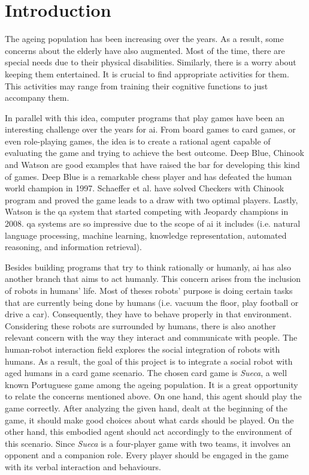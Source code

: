 \section{Introduction} \label{introduction}

The ageing population has been increasing over the years.
As a result, some concerns about the elderly have also augmented.
Most of the time, there are special needs due to their physical disabilities.
Similarly, there is a worry about keeping them entertained.
It is crucial to find appropriate activities for them.
This activities may range from training their cognitive functions to just accompany them.

In parallel with this idea, computer programs that play games have been an interesting challenge over the years for \gls{ai}.
From board games to card games, or even role-playing games, the idea is to create a rational agent capable of evaluating the game and trying to achieve the best outcome.
Deep Blue, Chinook and Watson are good examples that have raised the bar for developing this kind of games.
Deep Blue is a remarkable chess player and has defeated the human world champion in 1997.
Schaeffer et al. have solved Checkers with Chinook program and proved the game leads to a draw with two optimal players.
Lastly, Watson is the \gls{qa} system that started competing with Jeopardy champions in 2008.
\gls{qa} systems are so impressive due to the scope of \gls{ai} it includes (i.e. natural language processing, machine learning, knowledge representation, automated reasoning, and information retrieval).

Besides building programs that try to think rationally or humanly, \gls{ai} has also another branch that aims to act humanly.
This concern arises from the inclusion of robots in humans' life.
Most of theses robots' purpose is doing certain tasks that are currently being done by humans (i.e. vacuum the floor, play football or drive a car).
Consequently, they have to behave properly in that environment.
Considering these robots are surrounded by humans, there is also another relevant concern with the way they interact and communicate with people.
The human-robot interaction field explores the social integration of robots with humans.
As a result, the goal of this project is to integrate a social robot with aged humans in a card game scenario.
The chosen card game is \emph{Sueca}, a well known Portuguese game among the ageing population.
It is a great opportunity to relate the concerns mentioned above.
On one hand, this agent should play the game correctly.
After analyzing the given hand, dealt at the beginning of the game, it should make good choices about what cards should be played.
On the other hand, this embodied agent should act accordingly to the environment of this scenario.
Since \emph{Sueca} is a four-player game with two teams, it involves an opponent and a companion role.
Every player should be engaged in the game with its verbal interaction and behaviours.

